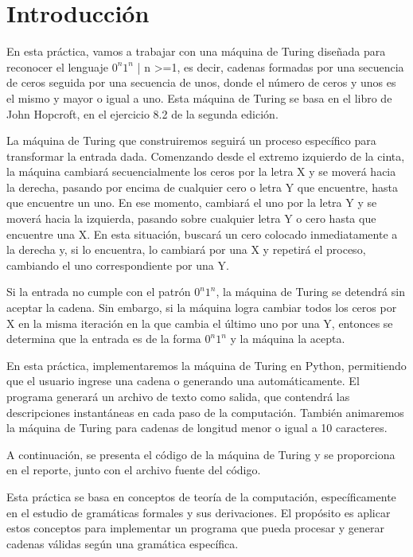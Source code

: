 \chapter{Introducción}
En esta práctica, vamos a trabajar con una máquina de Turing diseñada para reconocer el lenguaje {$0^n$$1^n$ | n >=1}, es decir, cadenas formadas por una secuencia de ceros seguida por una secuencia de unos, donde el número de ceros y unos es el mismo y mayor o igual a uno. Esta máquina de Turing se basa en el libro de John Hopcroft, en el ejercicio 8.2 de la segunda edición.\newline

La máquina de Turing que construiremos seguirá un proceso específico para transformar la entrada dada. Comenzando desde el extremo izquierdo de la cinta, la máquina cambiará secuencialmente los ceros por la letra X y se moverá hacia la derecha, pasando por encima de cualquier cero o letra Y que encuentre, hasta que encuentre un uno. En ese momento, cambiará el uno por la letra Y y se moverá hacia la izquierda, pasando sobre cualquier letra Y o cero hasta que encuentre una X. En esta situación, buscará un cero colocado inmediatamente a la derecha y, si lo encuentra, lo cambiará por una X y repetirá el proceso, cambiando el uno correspondiente por una Y.\newline

Si la entrada no cumple con el patrón $0^n$$1^n$, la máquina de Turing se detendrá sin aceptar la cadena. Sin embargo, si la máquina logra cambiar todos los ceros por X en la misma iteración en la que cambia el último uno por una Y, entonces se determina que la entrada es de la forma $0^n$$1^n$ y la máquina la acepta.\newline

En esta práctica, implementaremos la máquina de Turing en Python, permitiendo que el usuario ingrese una cadena o generando una automáticamente. El programa generará un archivo de texto como salida, que contendrá las descripciones instantáneas en cada paso de la computación. También animaremos la máquina de Turing para cadenas de longitud menor o igual a 10 caracteres.\newline

A continuación, se presenta el código de la máquina de Turing y se proporciona en el reporte, junto con el archivo fuente del código.\newline

Esta práctica se basa en conceptos de teoría de la computación, específicamente en el estudio de gramáticas formales y sus derivaciones. El propósito es aplicar estos conceptos para implementar un programa que pueda procesar y generar cadenas válidas según una gramática específica.\newline

